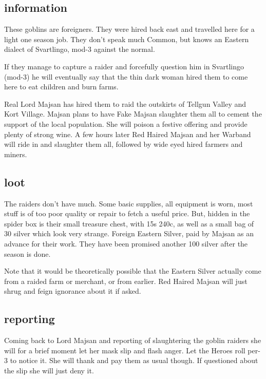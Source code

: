 \subsection*{information}
These goblins are foreigners. They were hired back east and travelled here for a light one season job. They don't speak much Common, but knows an Eastern dialect of Svartlingo, mod-3 against the normal.

If they manage to capture a raider and forcefully question him in Svartlingo (mod-3) he will eventually say that the thin dark woman hired them to come here to eat children and burn farms.

Real Lord Majsan has hired them to raid the outskirts of Tellgun Valley and Kort Village. Majsan plans to have Fake Majsan slaughter them all to cement the support of the local population. She will poison a festive offering and provide plenty of strong wine. A few hours later Red Haired Majsan and her Warband will ride in and slaughter them all, followed by wide eyed hired farmers and miners.


\subsection*{loot}
The raiders don't have much. Some basic supplies, all equipment is worn, most stuff is of too poor quality or repair to fetch a useful price. But, hidden in the spider box is their small treasure chest, with 15s 240c, as well as a small bag of 30 silver which look very strange. Foreign Eastern Silver, paid by Majsan as an advance for their work. They have been promised another 100 silver after the season is done.

Note that it would be theoretically possible that the Eastern Silver actually come from a raided farm or merchant, or from earlier. Red Haired Majsan will just shrug and feign ignorance about it if asked.


\subsection*{reporting}
Coming back to Lord Majsan and reporting of slaughtering the goblin raiders she will for a brief moment let her mask slip and flash anger. Let the Heroes roll per-3 to notice it. She will thank and pay them as usual though. If questioned about the slip she will just deny it.










